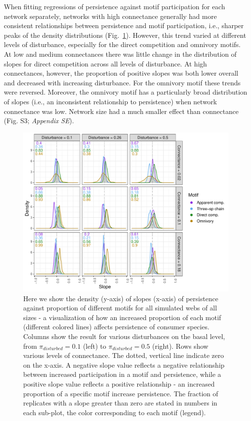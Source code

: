 \documentclass[12pt]{article}
\begin{document}
\begin{spacing}{2.0}
        When fitting regressions of persistence against motif participation for each network separately, networks with high connectance generally had more consistent relationships between persistence and motif participation, i.e., sharper peaks of the density distributions (Fig.~\ref{fig:density_prop_C}).
        However, this trend varied at different levels of disturbance, especially for the direct competition and omnivory motifs.
        At low and medium connectances there was little change in the distribution of slopes for direct competition across all levels of disturbance. 
        At high connectances, however, the proportion of positive slopes was both lower overall and decreased with increasing disturbance. 
        For the omnivory motif these trends were reversed. 
        Moreover, the omnivory motif has a particularly broad distribution of slopes (i.e., an inconsistent relationship to persistence) when network connectance was low. 
        Network size had a much smaller effect than connectance (Fig. S3; \emph{Appendix SE}).

        \begin{figure}[h!]
            \centering
            \includegraphics[width=\textwidth]{figures/prop_dens_bp_vs_C_allS.pdf}
            \caption{Here we show the density (y-axis) of slopes (x-axis) of persistence against proportion of different motifs for all simulated webs of all sizes - a visualization of how an increased proportion of each motif (different colored lines) affects persistence of consumer species. Columns show the result for various disturbances on the basal level, from $\pi_{disturbed} = 0.1$ (left) to $\pi_{disturbed} = 0.5$ (right). Rows show various levels of connectance. The dotted, vertical line indicate zero on the x-axis. A negative slope value reflects a negative relationship between increased participation in a motif and persistence, while a positive slope value reflects a positive relationship - an increased proportion of a specific motif increase persistence. The fraction of replicates with a slope greater than zero are stated in numbers in each sub-plot, the color corresponding to each motif (legend). }
            \label{fig:density_prop_C}
        \end{figure}    
    


\end{spacing}
\end{document}
